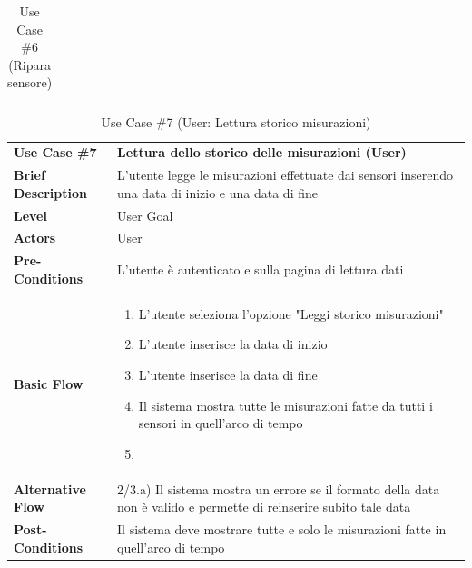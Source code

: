 \documentclass[a4paper, 11pt]{article}
\begin{document}
\begin{table}[h]
\begin{tabular}{|l p{12cm}|}
			\hline
		\end{tabular}

		\vspace{0.2cm}
		\caption{Use Case \#6 (Ripara sensore)}
	\end{table}
	\vspace{1cm}

	\begin{table}[h]
		\centering
		\setlength{\arrayrulewidth}{0.8pt} %

		\begin{tabular}{|l p{12cm}|}
			\hline

			\rowcolor{gray!25}
			\textbf{Use Case \#7} & \textbf{Lettura dello storico delle misurazioni (User)} \\
			\textbf{Brief Description} & L'utente legge le misurazioni effettuate dai sensori inserendo una data di inizio e una data di fine \\
			\textbf{Level} & User Goal \\
			\textbf{Actors} & User \\
			\textbf{Pre-Conditions} & L'utente è autenticato e sulla pagina di lettura dati \\
			\textbf{Basic Flow} & \begin{enumerate}[label=\arabic*), leftmargin=*, before=\vspace{-0.7cm}, after=\vspace{-0.4cm}]
									  \item L'utente seleziona l'opzione "Leggi storico misurazioni"
									  \item L'utente inserisce la data di inizio
									  \item L'utente inserisce la data di fine
									  \item Il sistema mostra tutte le misurazioni fatte da tutti i sensori in quell'arco di tempo
									  \item[]
			\end{enumerate} \\
			\textbf{Alternative Flow} & 2/3.a) Il sistema mostra un errore se il formato della data non è valido e permette di reinserire subito tale data\\
			\textbf{Post-Conditions} & Il sistema deve mostrare tutte e solo le misurazioni fatte in quell'arco di tempo \\

			\hline
		\end{tabular}

		\vspace{0.2cm}
		\caption{Use Case \#7 (User: Lettura storico misurazioni)}
	\end{table}
	\vspace{1cm}
\end{document}
